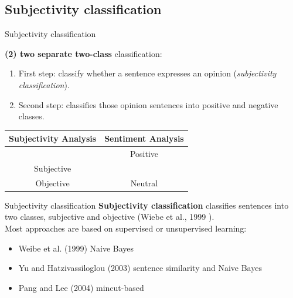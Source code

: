 \documentclass[xcolor=table]{beamer}
\begin{document}
\subsection{Subjectivity classification}
\begin{frame}{Subjectivity classification}

    \textbf{(2) two separate two-class} classification:
    \begin{enumerate}
        \item First step: classify whether a sentence expresses an opinion (\textit{subjectivity classification}).
        \item Second step: classifies those opinion sentences into positive and negative classes.
    \end{enumerate}
    
\begin{table}[]
\centering
\begin{tabular}{|c|c|}
\hline
\textbf{Subjectivity Analysis} & \textbf{Sentiment Analysis}                             \\ \hline
                               & \cellcolor[HTML]{009901}Positive                        \\ \cline{2-2} 
\multirow{-2}{*}{Subjective}   & \cellcolor[HTML]{F56B00}{\color[HTML]{333333} Negative} \\ \hline
Objective                      & \cellcolor[HTML]{ECF4FF}Neutral                         \\ \hline
\end{tabular}
\end{table}

\end{frame}


\begin{frame}{Subjectivity classification}
    \textbf{Subjectivity classification} classifies sentences into two classes, subjective and objective (Wiebe et al., 1999 \cite{wiebe1999development}).\\
    
    Most approaches are based on supervised or unsupervised learning:
    \begin{itemize}
        \item Weibe et al. (1999) \cite{wiebe1999development} Naive Bayes
        \item Yu and Hatzivassiloglou (2003) \cite{yu2003towards} sentence similarity and Naive Bayes
        \item Pang and Lee (2004) \cite{pang2004sentimental} mincut-based
    \end{itemize}
\end{frame}
\end{document}
